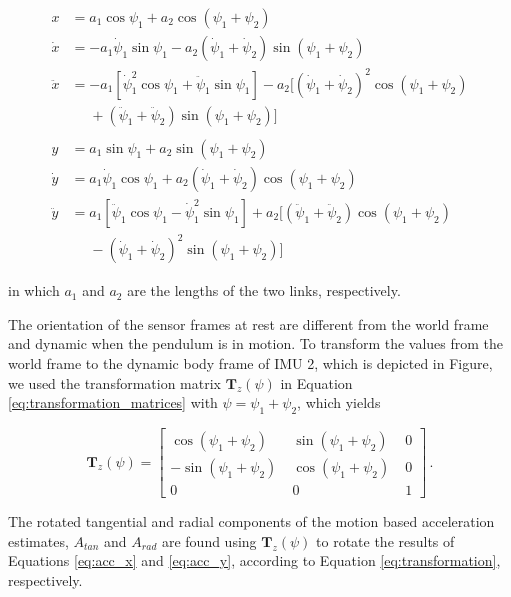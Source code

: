 \begin{align}
  x &= a_1 \cos \psi_1 + a_2 \cos(\psi_1 + \psi_2) \\
  \dot{x} &= -a_1 \dot{\psi}_1 \sin \psi_1  - a_2 (\dot{\psi}_1 + \dot{\psi}_2) \sin(\psi_1 + \psi_2) \\
  \ddot{x} {}&= -a_1 [\dot{\psi}^2_1 \cos \psi_1 + \ddot{\psi}_1 \sin \psi_1] - a_2 [(\dot{\psi}_1 + \dot{\psi}_2)^2 \cos(\psi_1 + \psi_2) \nonumber \\ 
  &\mathrel{\phantom{=}} + (\ddot{\psi}_1 + \ddot{\psi}_2) \sin(\psi_1 + \psi_2)] \label{eq:acc_x} \\
  \nonumber \\
  y &= a_1 \sin \psi_1 + a_2 \sin(\psi_1 + \psi_2) \\
  \dot{y} &= a_1 \dot{\psi}_1 \cos \psi_1  + a_2 (\dot{\psi}_1 + \dot{\psi}_2) \cos(\psi_1 + \psi_2) \\
  \ddot{y} {}&= a_1 [\ddot{\psi}_1 \cos \psi_1 - \dot{\psi}^2_1 \sin \psi_1] + a_2 [(\ddot{\psi}_1 + \ddot{\psi}_2) \cos(\psi_1 + \psi_2) \nonumber \\ 
  &\mathrel{\phantom{=}} - (\dot{\psi}_1 + \dot{\psi}_2)^2 \sin(\psi_1 + \psi_2)] \label{eq:acc_y}
\end{align}

\noindent
in which $a_1$ and $a_2$ are the lengths of the two links, respectively.

The orientation of the sensor frames at rest are different from the world frame and dynamic when the pendulum is in motion. To transform the values from the world frame to the dynamic body frame of \gls{IMU} 2, which is depicted in Figure, we used the transformation matrix $\mathbf{T}_z(\psi)$ in Equation \ref{eq:transformation_matrices} with $\psi = \psi_1 + \psi_2$, which yields

\begin{equation}
\mathbf{T}_z(\psi) = \begin{bmatrix}
    \cos (\psi_1 + \psi_2) \; & \sin (\psi_1 + \psi_2) \; & 0 \\
    -\sin (\psi_1 + \psi_2) \; & \cos (\psi_1 + \psi_2) \; & 0 \\
    0 \; & 0 \; & 1
    \end{bmatrix}\,.
\end{equation}

\noindent
The rotated tangential and radial components of the motion based acceleration estimates, $A_{tan}$ and $A_{rad}$ are found using $\mathbf{T}_z(\psi)$ to rotate the results of Equations \ref{eq:acc_x} and \ref{eq:acc_y}, according to Equation \ref{eq:transformation}, respectively.

